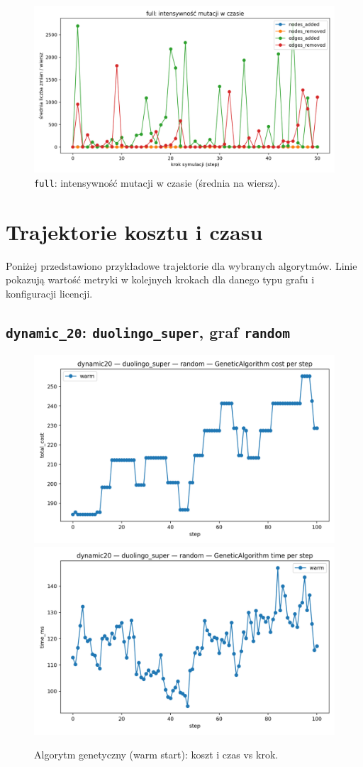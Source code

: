 \begin{figure}[H]
  \centering
  \includegraphics[width=0.75\linewidth]{assets/figures/dynamic/full_mutation_intensity.png}
  \caption{\texttt{full}: intensywność mutacji w czasie (średnia na wiersz).}
  \label{fig:full_mut}
\end{figure}

\section{Trajektorie kosztu i czasu}

Poniżej przedstawiono przykładowe trajektorie dla wybranych algorytmów. Linie pokazują wartość metryki w kolejnych krokach dla danego typu grafu i konfiguracji licencji.

\subsection{\texttt{dynamic\_20}: \texttt{duolingo\_super}, graf \texttt{random}}

\begin{figure}[H]
  \centering
  \includegraphics[width=0.48\linewidth]{assets/figures/dynamic/dynamic20/duolingo_super/random/GeneticAlgorithm_cost_per_step.png}
  \includegraphics[width=0.48\linewidth]{assets/figures/dynamic/dynamic20/duolingo_super/random/GeneticAlgorithm_time_per_step.png}
\caption{Algorytm genetyczny (warm start): koszt i czas vs krok.}
  \label{fig:dyn20_duo_genetic}
\end{figure}

